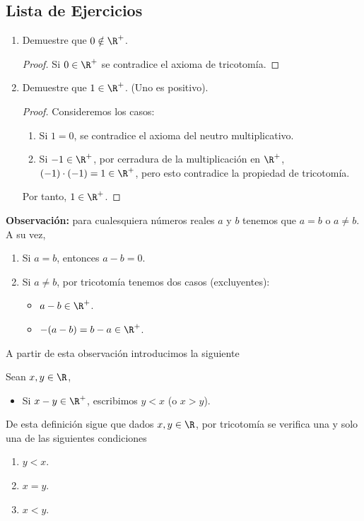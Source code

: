 \subsection*{Lista de Ejercicios}
\begin{enumerate}[label=\alph*)]
 \item Demuestre que $0\notin \R^+$.
 \begin{proof} 
 Si $0\in \R^+$ se contradice el axioma de tricotomía.
 \end{proof}

 \item Demuestre que $1\in \R^+$. (Uno es positivo).
 \begin{proof} Consideremos los casos: \begin{enumerate}[label=\roman*)]
 \item Si $1=0$, se contradice el axioma del neutro multiplicativo.
 \item Si $-1\in \R^+$, por cerradura de la multiplicación en $\R^+$, $(-1) \cdot (-1)=1\in \R^+$, pero esto contradice la propiedad de tricotomía.
 \end{enumerate} Por tanto, $1\in \R^+$.
 \end{proof}
\end{enumerate}

\textbf{Observación:} para cualesquiera números reales $a$ y $b$ tenemos que $a=b$ o $a\neq b$. A su vez, \begin{enumerate}[label=\roman*)]
\item Si $a=b$, entonces $a-b=0$.
\item Si $a\neq b$, por tricotomía tenemos dos casos (excluyentes):\begin{itemize}
 \item $a-b\in \R^+$.%
 \item $-(a-b)=b-a\in \R^+$.%
\end{itemize}%
\end{enumerate}

A partir de esta observación introducimos la siguiente 

Sean $x,y\in \R$, \begin{itemize}
 \item Si $x-y\in \R^+$, escribimos $y<x$ (o $x>y$).
\end{itemize}

De esta definición sigue que dados $x,y\in \R$, por tricotomía se verifica una y solo una de las siguientes condiciones\vspace{-1em} \begin{enumerate}[label=\roman*)]
 \item $y<x$.
 \item $x=y$.
 \item $x<y$.
\end{enumerate}

